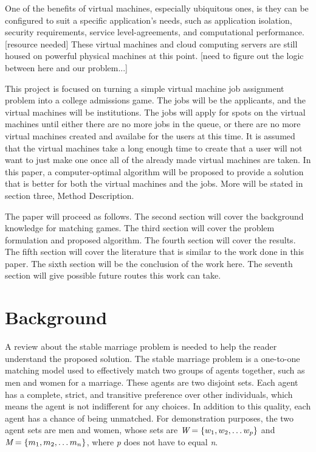 \documentclass[conference]{IEEEtran}
\begin{document}
One of the benefits of virtual machines, especially ubiquitous
ones, is they can be configured to suit a specific application's
needs, such as application isolation, security requirements,
service level-agreements, and computational performance.  [resource needed]
These virtual machines and cloud computing servers
are still housed on powerful physical machines at this point.
[need to figure out the logic between here and our problem...]

This project is focused on turning a simple virtual machine job assignment
problem into a college admissions game.  The jobs will be the applicants,
and the virtual machines will be institutions.  The jobs will apply for spots
on the virtual machines until either there are no more jobs in the 
queue, or there are no more virtual machines created and availabe for the
users at this time.  It is assumed that the virtual machines take a long
enough time to create that a user will not want to just make one
once all of the already made virtual machines are taken.  In this paper,
a computer-optimal algorithm will be proposed to provide a solution
that is better for both the virtual machines and the jobs.  More will be stated
in section three, Method Description.

The paper will proceed as follows.  The second section will cover the
background knowledge for matching games.  The third section
will cover the problem formulation and proposed algorithm.  The 
fourth section will cover the results.  The fifth section will cover the
literature that is similar to the work done in this paper.  The sixth section will
be the conclusion of the work here.  The seventh section will
give possible future routes this work can take.  

\section{Background}
A review about the stable marriage problem is needed
to help the reader understand the proposed solution.
The stable marriage problem is a one-to-one matching
model used to effectively match two groups of agents
 together, such as men and women for a marriage.  
These agents are two disjoint sets.  Each agent
has a complete, strict, and  transitive preference over other
individuals, which means the agent is not indifferent for any choices.  In 
addition to this quality, each agent has a chance
of being unmatched. For demonstration purposes,
the two agent sets are men and women, whose sets are 
\( \emph{W} = \{ {w_1}, {w_2}, \ldots {w_p} \} \) and
\( \emph{M} =\{ {m_1}, {m_2}, \ldots {m_n} \} \), 
where \emph{p} does not have to equal \emph{n}.
\end{document}
